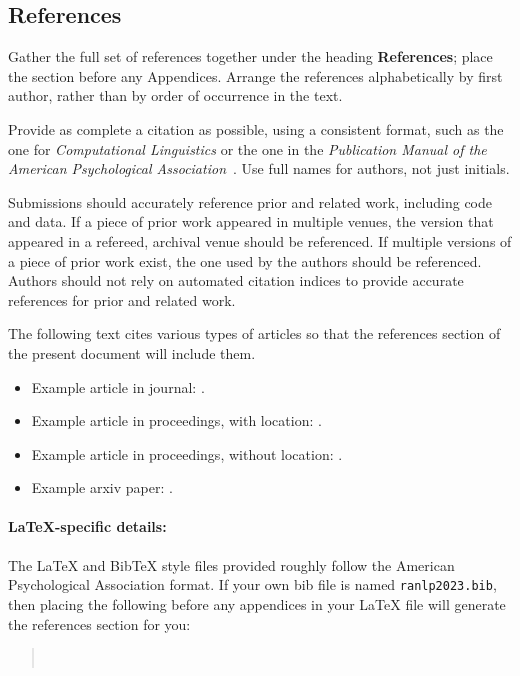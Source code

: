\documentclass[11pt,a4paper]{article}
\begin{document}
\subsection{References}
Gather the full set of references together under the heading \textbf{References}; place the section before any Appendices. 
Arrange the references alphabetically by first author, rather than by order of occurrence in the text.

Provide as complete a citation as possible, using a consistent format, such as the one for \emph{Computational Linguistics\/} or the one in the  \emph{Publication Manual of the American 
Psychological Association\/}~\citep{APA:83}.
Use full names for authors, not just initials.

Submissions should accurately reference prior and related work, including code and data.
If a piece of prior work appeared in multiple venues, the version that appeared in a refereed, archival venue should be referenced.
If multiple versions of a piece of prior work exist, the one used by the authors should be referenced.
Authors should not rely on automated citation indices to provide accurate references for prior and related work.

The following text cites various types of articles so that the references section of the present document will include them.
\begin{itemize}
\item Example article in journal: \citep{Ando2005}.
\item Example article in proceedings, with location: \citep{borschinger-johnson-2011-particle}.
\item Example article in proceedings, without location: \citep{andrew2007scalable}.
\item Example arxiv paper: \citep{rasooli-tetrault-2015}. 
\end{itemize}


\paragraph{\LaTeX-specific details:}
The \LaTeX{} and Bib\TeX{} style files provided roughly follow the American Psychological Association format.
If your own bib file is named \texttt{\small ranlp2023.bib}, then placing the following before any appendices in your \LaTeX{}  file will generate the references section for you:
\begin{quote}\small
\verb||\\
\verb||
\end{quote}
\end{document}
